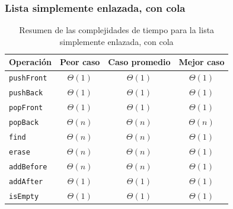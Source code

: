 \subsubsection{Lista simplemente enlazada, con cola}

\begin{table}[htbp]
  \centering{}
  \begin{tabular}{lccc}
    \toprule
    Operación & Peor caso & Caso promedio & Mejor caso \\
    \midrule
    \texttt{pushFront} & $\Theta{} (1)$ & $\Theta{} (1)$ & $\Theta{} (1)$ \\
    \texttt{pushBack} & $\Theta{} (1)$ & $\Theta{} (1)$ & $\Theta{} (1)$ \\
    \texttt{popFront} & $\Theta{} (1)$ & $\Theta{} (1)$ & $\Theta{} (1)$ \\
    \texttt{popBack} & $\Theta{} (n)$ & $\Theta{} (n)$ & $\Theta{} (n)$ \\
    \texttt{find} & $\Theta{} (n)$ & $\Theta{} (n)$ & $\Theta{} (1)$ \\
    \texttt{erase} & $\Theta{} (n)$ & $\Theta{} (n)$ & $\Theta{} (1)$ \\
    \texttt{addBefore} & $\Theta{} (n)$ & $\Theta{} (n)$ & $\Theta{} (1)$ \\
    \texttt{addAfter} & $\Theta{} (1)$ & $\Theta{} (1)$ & $\Theta{} (1)$ \\
    \texttt{isEmpty} & $\Theta{} (1)$ & $\Theta{} (1)$ & $\Theta{} (1)$ \\
    \bottomrule
  \end{tabular}
  \caption{Resumen de las complejidades de tiempo para la lista simplemente enlazada, con cola}
  \label{tab:resumen-con-cola}
\end{table}

